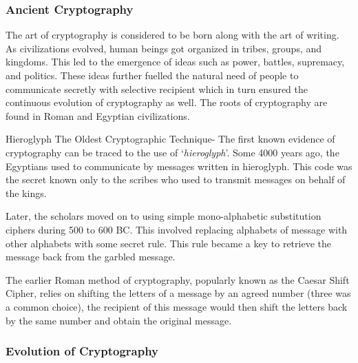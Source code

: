\documentclass[british]{article}
\begin{document}
\subsubsection{Ancient Cryptography}

The art of cryptography is considered to be born along with the art
of writing. As civilizations evolved, human beings got organized in
tribes, groups, and kingdoms. This led to the emergence of ideas such
as power, battles, supremacy, and politics. These ideas further fuelled
the natural need of people to communicate secretly with selective
recipient which in turn ensured the continuous evolution of cryptography
as well. The roots of cryptography are found in Roman and Egyptian
civilizations.

Hieroglyph \textminus{} The Oldest Cryptographic Technique- The first
known evidence of cryptography can be traced to the use of \textquoteleft \textit{hieroglyph}\textquoteright .
Some 4000 years ago, the Egyptians used to communicate by messages
written in hieroglyph. This code was the secret known only to the
scribes who used to transmit messages on behalf of the kings.

Later, the scholars moved on to using simple mono-alphabetic substitution
ciphers during 500 to 600 BC. This involved replacing alphabets of
message with other alphabets with some secret rule. This rule became
a key to retrieve the message back from the garbled message.

The earlier Roman method of cryptography, popularly known as the Caesar
Shift Cipher, relies on shifting the letters of a message by an agreed
number (three was a common choice), the recipient of this message
would then shift the letters back by the same number and obtain the
original message.

\subsubsection{Evolution of Cryptography}
\end{document}

